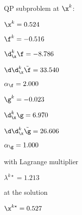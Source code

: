 QP subproblem at $\x^{k}$:

\bigskip
$\x^k=   0.524$


$\f^k =  -0.516$

$\d^k_{\x} \f =  -8.786$

$\d\d^k_{\x} \tilde \f =  33.540$

$\alpha_{\footnotesize\f} =   2.000$

\bigskip
$\g^k =  -0.023$

$\d^k_{\x}\g =   6.970$

$\d\d^k_{\x} \tilde \g =  26.606$

$\alpha_{\footnotesize\g} =   1.000$

\bigskip
with Lagrange multiplier

$\lambda^{k\star} =   1.213$

at the solution

$\x^{k\star} =   0.527$

